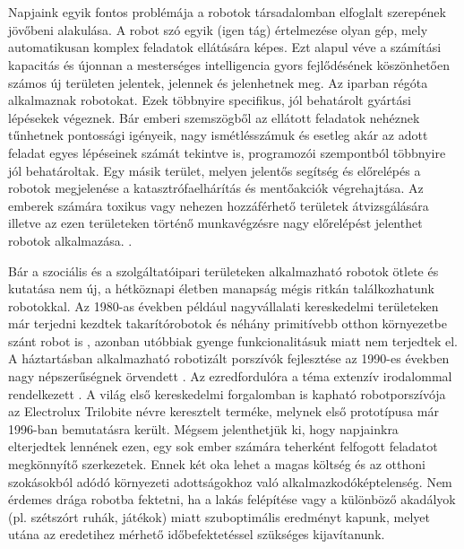 \chapter{\bevezetes}

Napjaink egyik fontos problémája a robotok társadalomban elfoglalt szerepének jövőbeni alakulása. A robot szó egyik (igen tág) értelmezése olyan gép, mely automatikusan komplex feladatok ellátására képes. Ezt alapul véve a számítási kapacitás és újonnan a mesterséges intelligencia gyors fejlődésének köszönhetően számos új területen jelentek, jelennek és jelenhetnek meg. Az iparban régóta  alkalmaznak robotokat. Ezek többnyire specifikus, jól behatárolt gyártási lépésekek végeznek. Bár emberi szemszögből az ellátott feladatok nehéznek tűnhetnek pontossági igényeik, nagy ismétlésszámuk és esetleg akár az adott feladat egyes lépéseinek számát tekintve is, programozói szempontból többnyire jól behatároltak. Egy másik terület, melyen jelentős segítség és előrelépés a robotok megjelenése a katasztrófaelhárítás és mentőakciók végrehajtása.  Az emberek számára toxikus vagy nehezen hozzáférhető területek átvizsgálására illetve az ezen területeken történő munkavégzésre nagy előrelépést jelenthet robotok alkalmazása. .

Bár a szociális és a szolgáltatóipari területeken alkalmazható robotok ötlete és kutatása nem új, a hétköznapi életben manapság mégis ritkán találkozhatunk robotokkal. Az 1980-as években például nagyvállalati kereskedelmi területeken már terjedni kezdtek takarítórobotok és néhány primitívebb otthon környezetbe szánt robot is \cite{engelberger_robotics_1989}, azonban utóbbiak gyenge funkcionalitásuk miatt nem terjedtek el. A háztartásban alkalmazható robotizált porszívók fejlesztése az 1990-es években nagy népszerűségnek örvendett \cite{brittain_autonomous_1993} \cite{brutzman_beyond_1993} \cite{coombs_robovac_1993}. Az ezredfordulóra a téma extenzív irodalommal rendelkezett \cite{fiorini_cleaning_2000}. A világ első kereskedelmi forgalomban is kapható robotporszívója az Electrolux Trilobite névre keresztelt terméke, melynek első prototípusa már 1996-ban bemutatásra került.
Mégsem jelenthetjük ki, hogy napjainkra elterjedtek lennének ezen, egy sok ember számára teherként felfogott feladatot megkönnyítő szerkezetek. Ennek két oka lehet a magas költség és az otthoni szokásokból adódó környezeti adottságokhoz való alkalmazkodóképtelenség. Nem érdemes drága robotba fektetni, ha a lakás felépítése vagy a különböző akadályok (pl. szétszórt ruhák, játékok) miatt szuboptimális eredményt kapunk, melyet utána az eredetihez mérhető időbefektetéssel szükséges kijavítanunk.


